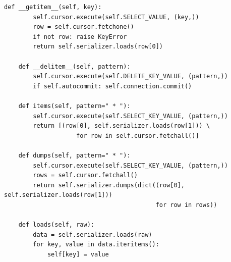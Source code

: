 \documentclass[justified, sixbynine]{tufte-book}
\def\ft{\small\tt}
\theoremstyle{plain}%
\newtheorem * {corollary}{Corollary}
\theoremstyle{definition}
\theoremstyle{remark}
\newtheorem * {remark}{Remark}
\newtheorem * {note}{Note}
\begin{document}
\begin{fullwidth}
\begin{lstlisting}[caption={in file: {\ft nlib.py}}]
    def __getitem__(self, key):
        self.cursor.execute(self.SELECT_VALUE, (key,))
        row = self.cursor.fetchone()
        if not row: raise KeyError
        return self.serializer.loads(row[0])

    def __delitem__(self, pattern):
        self.cursor.execute(self.DELETE_KEY_VALUE, (pattern,))
        if self.autocommit: self.connection.commit()

    def items(self, pattern=" * "):
        self.cursor.execute(self.SELECT_KEY_VALUE, (pattern,))
        return [(row[0], self.serializer.loads(row[1])) \
                    for row in self.cursor.fetchall()]

    def dumps(self, pattern=" * "):
        self.cursor.execute(self.SELECT_KEY_VALUE, (pattern,))
        rows = self.cursor.fetchall()
        return self.serializer.dumps(dict((row[0], self.serializer.loads(row[1])) 
                                          for row in rows))
            
    def loads(self, raw):
        data = self.serializer.loads(raw)
        for key, value in data.iteritems():
            self[key] = value
\end{lstlisting}


\end{fullwidth}
\end{document}
